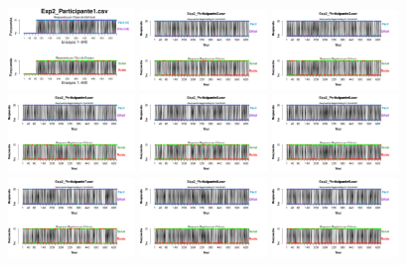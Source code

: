 \documentclass[a4paper ]{article}
\begin{document}
\begin{figure}[th]
\centering
\includegraphics[width=0.3\textwidth]{Figures/BiasResp_Exp2_P1} \includegraphics[width=0.3\textwidth]{Figures/BiasResp_Exp2_P2} \includegraphics[width=0.3\textwidth]{Figures/BiasResp_Exp2_P3}
\includegraphics[width=0.3\textwidth]{Figures/BiasResp_Exp2_P4} \includegraphics[width=0.3\textwidth]{Figures/BiasResp_Exp2_P5} \includegraphics[width=0.3\textwidth]{Figures/BiasResp_Exp2_P6}
\includegraphics[width=0.3\textwidth]{Figures/BiasResp_Exp2_P7} \includegraphics[width=0.3\textwidth]{Figures/BiasResp_Exp2_P8} \includegraphics[width=0.3\textwidth]{Figures/BiasResp_Exp2_P9}

\end{figure}
\end{document}
